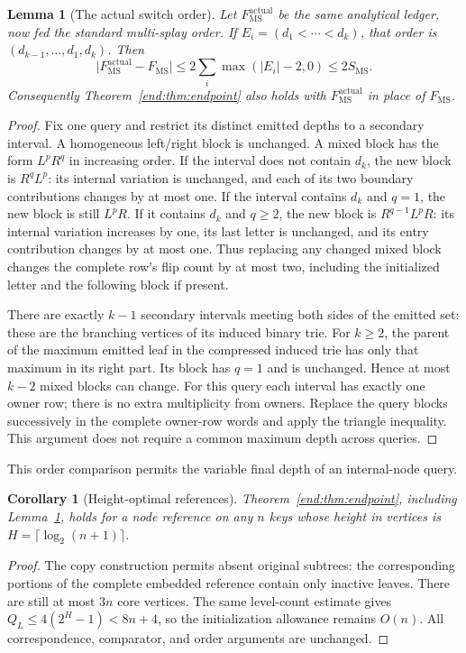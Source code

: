 \documentclass[11pt]{article}
\numberwithin{equation}{section}
\newtheorem{lemma}[theorem]{Lemma}
\newtheorem{corollary}[theorem]{Corollary}
\newcommand{\MS}{\mathrm{MS}}
\begin{document}
\begin{lemma}[The actual switch order]\label{end:lem:order}
Let $F_{\MS}^{\mathrm{actual}}$ be the same analytical ledger, now fed
the standard multi-splay order. If
$E_i=(d_1<\cdots<d_k)$, that order is
$(d_{k-1},\ldots,d_1,d_k)$. Then
\[
 \bigl|F_{\MS}^{\mathrm{actual}}-F_{\MS}\bigr|
 \le 2\sum_i\max(|E_i|-2,0)\le2S_{\MS}.
\]
Consequently Theorem~\ref{end:thm:endpoint} also holds with
$F_{\MS}^{\mathrm{actual}}$ in place of $F_{\MS}$.
\end{lemma}
\begin{proof}
Fix one query and restrict its distinct emitted depths to a secondary
interval. A homogeneous left/right block is unchanged. A mixed block
has the form $L^pR^q$ in increasing order. If the interval does not
contain $d_k$, the new block is $R^qL^p$: its internal variation is
unchanged, and each of its two boundary contributions changes by at
most one. If the interval contains $d_k$ and $q=1$, the new block is
still $L^pR$. If it contains $d_k$ and $q\ge2$, the new block is
$R^{q-1}L^pR$: its internal variation increases by one, its last letter
is unchanged, and its entry contribution changes by at most one.
Thus replacing any changed mixed block changes the complete row's
flip count by at most two, including the initialized letter and the
following block if present.

There are exactly $k-1$ secondary intervals meeting both sides of the
emitted set: these are the branching vertices of its induced binary
trie. For $k\ge2$, the parent of the maximum emitted leaf in the
compressed induced trie has only that maximum in its right part.
Its block has $q=1$ and is unchanged. Hence at most $k-2$ mixed blocks
can change. For this query each interval has exactly one owner row;
there is no extra multiplicity from owners. Replace the query blocks
successively in the complete owner-row words and apply the triangle
inequality. This argument does not require a common maximum depth
across queries.
\end{proof}

This order comparison permits the variable final depth of an internal-node query.

\begin{corollary}[Height-optimal references]
Theorem~\ref{end:thm:endpoint}, including Lemma~\ref{end:lem:order}, holds for a
node reference on any $n$ keys whose height in vertices is
$H=\lceil\log_2(n+1)\rceil$.
\end{corollary}
\begin{proof}
The copy construction permits absent original subtrees: the
corresponding portions of the complete embedded reference contain only
inactive leaves. There are still at most $3n$ core vertices. The same
level-count estimate gives
$Q_L\le4(2^H-1)<8n+4$, so the initialization allowance remains $O(n)$.
All correspondence, comparator, and order arguments are unchanged.
\end{proof}
\end{document}
